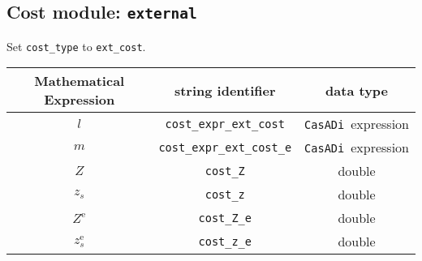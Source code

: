 \documentclass{article}
\newcommand{\code}[1]{\texttt{#1}}
\newcommand{\casadi}{\texttt{CasADi}}
\newcommand{\terminal}{^{\textrm{e}}}
\begin{document}
\subsection*{Cost module: \code{external}}
Set \code{cost\_type} to \code{ext\_cost}. %
\begin{table}[h!]
	\centering
	\begin{tabular}{|c|c|c|}
		\toprule
		Mathematical Expression                    & string identifier & data type \\ \midrule
		$ l $ & \code{cost\_expr\_ext\_cost}    & \casadi~expression    \\ \midrule
		$ m $ & \code{cost\_expr\_ext\_cost\_e}    & \casadi~expression    \\ \midrule
		$ Z $ & \code{cost\_Z}    & double    \\ \midrule
		$ z_s $ & \code{cost\_z}    & double    \\ \midrule
		$ Z\terminal $ & \code{cost\_Z\_e}    & double    \\ \midrule
		$ z_s\terminal $ & \code{cost\_z\_e}    & double    \\
		\bottomrule
	\end{tabular}
\end{table}
\end{document}
